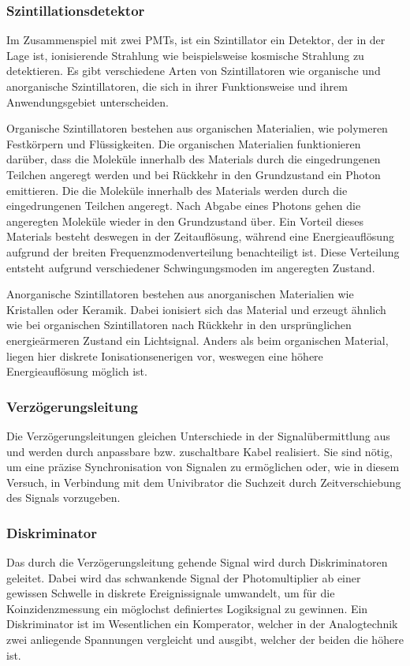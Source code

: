 \subsubsection*{Szintillationsdetektor}
Im Zusammenspiel mit zwei PMTs, ist ein Szintillator ein Detektor, der in der Lage ist, 
ionisierende Strahlung wie beispielsweise kosmische Strahlung zu detektieren. 
Es gibt verschiedene Arten von Szintillatoren wie organische und anorganische Szintillatoren,
die sich in ihrer Funktionsweise und ihrem Anwendungsgebiet unterscheiden.

Organische Szintillatoren bestehen aus organischen Materialien,
wie polymeren Festkörpern und Flüssigkeiten.
Die organischen Materialien funktionieren darüber, 
dass die Moleküle innerhalb des Materials durch die eingedrungenen Teilchen angeregt werden 
und bei Rückkehr in den Grundzustand ein Photon emittieren.
Die die Moleküle innerhalb des Materials werden durch die eingedrungenen Teilchen angeregt. 
Nach Abgabe eines Photons gehen die angeregten Moleküle wieder in den Grundzustand über.
Ein Vorteil dieses Materials besteht deswegen in der Zeitauflösung, 
während eine Energieauflösung aufgrund der breiten Frequenzmodenverteilung benachteiligt ist.
Diese Verteilung entsteht aufgrund verschiedener Schwingungsmoden im angeregten Zustand.

Anorganische Szintillatoren bestehen aus anorganischen Materialien wie Kristallen oder Keramik. 
Dabei ionisiert sich das Material und erzeugt ähnlich wie bei organischen Szintillatoren 
nach Rückkehr in den ursprünglichen energieärmeren Zustand ein Lichtsignal.
Anders als beim organischen Material, liegen hier diskrete Ionisationsenerigen vor,
weswegen eine höhere Energieauflösung möglich ist.

\subsubsection*{Verzögerungsleitung}
Die Verzögerungsleitungen gleichen Unterschiede in der Signalübermittlung aus
und werden durch anpassbare bzw. zuschaltbare Kabel realisiert.
Sie sind nötig, um eine präzise Synchronisation von Signalen zu ermöglichen
oder, wie in diesem Versuch, in Verbindung mit dem Univibrator die Suchzeit durch Zeitverschiebung des Signals vorzugeben.

\subsubsection*{Diskriminator}
Das durch die Verzögerungsleitung gehende Signal wird durch Diskriminatoren geleitet.
Dabei wird das schwankende Signal der Photomultiplier ab einer gewissen Schwelle in diskrete
Ereignissignale umwandelt, um für die Koinzidenzmessung ein möglochst definiertes Logiksignal zu gewinnen.
Ein Diskriminator ist im Wesentlichen ein Komperator, 
welcher in der Analogtechnik zwei anliegende Spannungen vergleicht und ausgibt,
welcher der beiden die höhere ist. 

